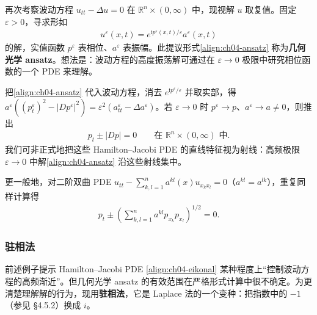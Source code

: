 \documentclass[../../main.tex]{subfiles}
\begin{document}
\begin{example}[振荡解]\label{example:ch04-geo-optics}再次考察波动方程 $u_{tt}-\Delta u=0$ 在 $\mathbb{R}^n\times(0,\infty)$ 中，现视解 $u$ 取复值。固定 $\varepsilon>0$，寻求形如
\begin{align}\label{align:ch04-ansatz}
u^\varepsilon(x,t)=e^{\mathrm{i}p^\varepsilon(x,t)/\varepsilon}a^\varepsilon(x,t)
\end{align}
的解，实值函数 $p^\varepsilon$ 表相位、$a^\varepsilon$ 表振幅。此提议形式\eqref{align:ch04-ansatz} 称为\textbf{几何光学 ansatz}。想法是：波动方程的高度振荡解可通过在 $\varepsilon\to 0$ 极限中研究相位函数的一个 PDE 来理解。

把\eqref{align:ch04-ansatz} 代入波动方程，消去 $e^{\mathrm{i}p^\varepsilon/\varepsilon}$ 并取实部，得 $a^\varepsilon((p_t^\varepsilon)^2-|Dp^\varepsilon|^2)=\varepsilon^2(a_{tt}^\varepsilon-\Delta a^\varepsilon)$。若 $\varepsilon\to 0$ 时 $p^\varepsilon\to p$、$a^\varepsilon\to a\neq 0$，则推出
\begin{align}\label{align:ch04-eikonal}
p_t\pm|Dp|=0 \qquad\text{在 }\mathbb{R}^n\times(0,\infty)\text{ 中}.
\end{align}
我们可非正式地把这些 Hamilton--Jacobi PDE 的直线特征视为射线：高频极限 $\varepsilon\to 0$ 中解\eqref{align:ch04-ansatz} 沿这些射线集中。
\end{example}

更一般地，对二阶双曲 PDE $u_{tt}-\sum_{k,l=1}^n a^{kl}(x)u_{x_kx_l}=0$（$a^{kl}=a^{lk}$），重复同样计算得
\begin{align}\label{align:ch04-eikonal-general}
p_t\pm\left(\sum_{k,l=1}^n a^{kl}p_{x_k}p_{x_l}\right)^{1/2}=0.
\end{align}

\subsubsection{驻相法}

前述例子提示 Hamilton--Jacobi PDE \eqref{align:ch04-eikonal} 某种程度上``控制波动方程的高频渐近''。但几何光学 ansatz 的有效范围在严格形式计算中很不确定。为更清楚理解解的行为，现用\textbf{驻相法}，它是 Laplace 法的一个变种：把指数中的 $-1$（参见 \S4.5.2）换成 $i$。
\end{document}
